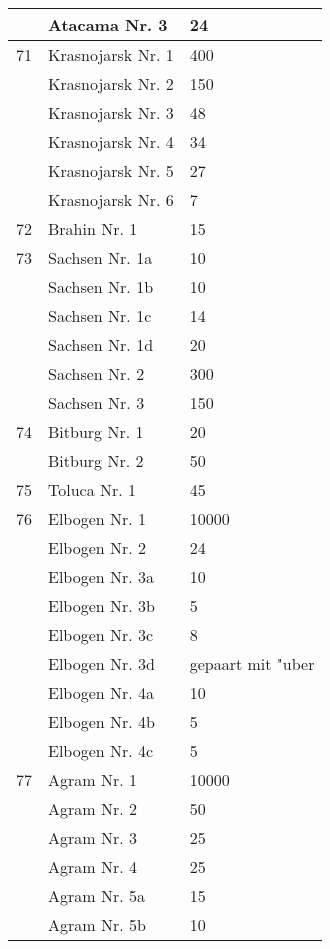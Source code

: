 \documentclass[a4paper, 11pt, oneside, polutonikogreek, german]{article}
\begin{document}
\begin{center}
\begin{longtable}{|l|l|l|}
          & Atacama Nr. 3 & 24 \\ \hline
        71 & Krasnojarsk Nr. 1 & 400 \\ \hline
          & Krasnojarsk Nr. 2 & 150 \\ \hline
          & Krasnojarsk Nr. 3 & 48 \\ \hline
          & Krasnojarsk Nr. 4 & 34 \\ \hline
          & Krasnojarsk Nr. 5 & 27 \\ \hline
          & Krasnojarsk Nr. 6 & 7 \\ \hline
        72 & Brahin Nr. 1 & 15 \\ \hline
        73 & Sachsen Nr. 1a & 10 \\ \hline
          & Sachsen Nr. 1b & 10 \\ \hline
          & Sachsen Nr. 1c & 14 \\ \hline
          & Sachsen Nr. 1d & 20 \\ \hline
          & Sachsen Nr. 2 & 300 \\ \hline
          & Sachsen Nr. 3 & 150 \\ \hline
        74 & Bitburg Nr. 1 & 20 \\ \hline
          & Bitburg Nr. 2 & 50 \\ \hline
        75 & Toluca Nr. 1 & 45 \\ \hline
        76 & Elbogen Nr. 1 & 10000 \\ \hline
          & Elbogen Nr. 2 & 24 \\ \hline
          & Elbogen Nr. 3a & 10 \\ \hline
          & Elbogen Nr. 3b & 5 \\ \hline
          & Elbogen Nr. 3c & 8 \\ \hline
          & Elbogen Nr. 3d & gepaart mit "uber \\ \hline
          & Elbogen Nr. 4a & 10 \\ \hline
          & Elbogen Nr. 4b & 5 \\ \hline
          & Elbogen Nr. 4c & 5 \\ \hline
        77 & Agram Nr. 1 & 10000 \\ \hline
          & Agram Nr. 2 & 50 \\ \hline
          & Agram Nr. 3 & 25 \\ \hline
          & Agram Nr. 4 & 25 \\ \hline
          & Agram Nr. 5a & 15 \\ \hline
          & Agram Nr. 5b & 10 \\ \hline

\end{longtable}
\end{center}
\end{document}
